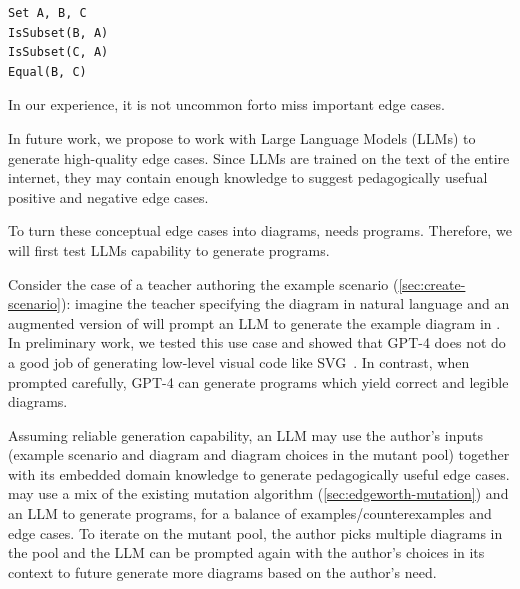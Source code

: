 \noindent\hspace*{\fill}
\begin{minipage}[c]{0.23\columnwidth}
\begin{mdframed}[style=SUBCode]
\begin{lstlisting}[language=Sub-SET,escapechar=@,numbers=none]
Set A, B, C
IsSubset(B, A)
IsSubset(C, A)
Equal(B, C)
\end{lstlisting}
\end{mdframed}
\end{minipage}
\hspace*{\fill}

\noindent In our experience, it is not uncommon for\Edgeworth to miss important edge cases. 

In future work, we propose to work with Large Language Models (LLMs) to generate high-quality edge cases. Since LLMs are trained on the text of the entire internet, they may contain enough knowledge to suggest pedagogically usefual positive and negative edge cases.

To turn these conceptual edge cases into diagrams, \Penrose{} needs \Substance programs. Therefore, we will first test LLMs capability to generate  \Substance programs.

Consider the case of a teacher authoring the example scenario (\cref{sec:create-scenario}): imagine the teacher specifying the diagram in natural language and an augmented version of \Edgeworth will prompt an LLM to generate the example diagram in \Substance. In preliminary work, we tested this use case and showed that GPT-4 does not do a good job of generating low-level visual code like SVG~\cite{penrosellm}. In contrast, when prompted carefully, GPT-4 can generate \Substance programs which yield correct and legible diagrams.

Assuming reliable \Substance generation capability, an LLM may use the author's inputs (\ie example scenario \Substance and diagram and diagram choices in the mutant pool) together with its embedded domain knowledge to generate pedagogically useful edge cases. \Edgeworth may use a mix of the existing mutation algorithm (\cref{sec:edgeworth-mutation}) and an LLM to generate \Substance programs, for a balance of examples/counterexamples and edge cases. To iterate on the mutant pool, the author picks multiple diagrams in the pool and the LLM can be prompted again with the author's choices in its context to future generate more diagrams based on the author's need.

